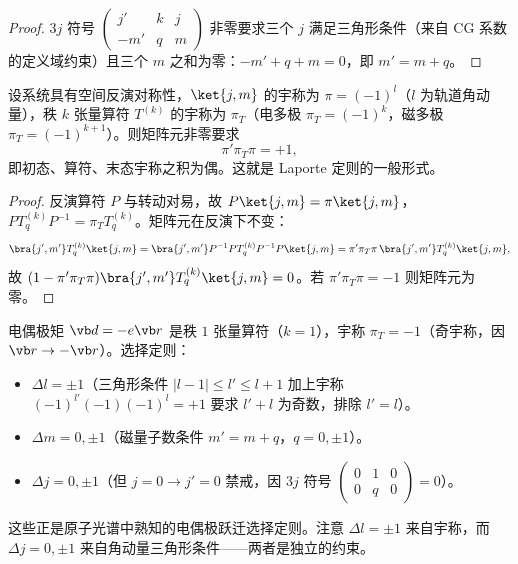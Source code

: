 \begin{proof}
$3j$ 符号 $\begin{pmatrix}j'&k&j\\-m'&q&m\end{pmatrix}$ 非零要求三个 $j$ 满足三角形条件（来自 CG 系数的定义域约束）且三个 $m$ 之和为零：$-m'+q+m=0$，即 $m'=m+q$。
\end{proof}
\begin{proposition}[宇称选择定则]
设系统具有空间反演对称性，$\ket{j,m}$ 的宇称为 $\pi=(-1)^l$（$l$ 为轨道角动量），秩 $k$ 张量算符 $T^{(k)}$ 的宇称为 $\pi_T$（电多极 $\pi_T=(-1)^k$，磁多极 $\pi_T=(-1)^{k+1}$）。则矩阵元非零要求
\[
\pi'\pi_T\pi=+1,
\]
即初态、算符、末态宇称之积为偶。这就是 Laporte 定则的一般形式。
\end{proposition}
\begin{proof}
反演算符 $P$ 与转动对易，故 $P\ket{j,m}=\pi\ket{j,m}$，$PT^{(k)}_qP^{-1}=\pi_T T^{(k)}_q$。矩阵元在反演下不变：
\[
\bra{j',m'}T^{(k)}_q\ket{j,m}
=\bra{j',m'}P^{-1}PT^{(k)}_qP^{-1}P\ket{j,m}
=\pi'\pi_T\pi\,\bra{j',m'}T^{(k)}_q\ket{j,m},
\]
故 $(1-\pi'\pi_T\pi)\bra{j',m'}T^{(k)}_q\ket{j,m}=0$。若 $\pi'\pi_T\pi=-1$ 则矩阵元为零。
\end{proof}
电偶极矩 $\vb d=-e\vb r$ 是秩 $1$ 张量算符（$k=1$），宇称 $\pi_T=-1$（奇宇称，因 $\vb r\to-\vb r$）。选择定则：
\begin{itemize}
\item $\Delta l=\pm1$（三角形条件 $|l-1|\le l'\le l+1$ 加上宇称 $(-1)^{l'}(-1)(-1)^l=+1$ 要求 $l'+l$ 为奇数，排除 $l'=l$）。
\item $\Delta m=0,\pm1$（磁量子数条件 $m'=m+q$，$q=0,\pm1$）。
\item $\Delta j=0,\pm1$（但 $j=0\to j'=0$ 禁戒，因 $3j$ 符号 $\begin{pmatrix}0&1&0\\0&q&0\end{pmatrix}=0$）。
\end{itemize}
这些正是原子光谱中熟知的电偶极跃迁选择定则。注意 $\Delta l=\pm1$ 来自宇称，而 $\Delta j=0,\pm1$ 来自角动量三角形条件——两者是独立的约束。


